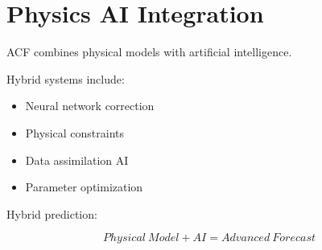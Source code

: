 \section{Physics AI Integration}


ACF combines physical models with artificial intelligence.



Hybrid systems include:


\begin{itemize}

\item Neural network correction

\item Physical constraints

\item Data assimilation AI

\item Parameter optimization

\end{itemize}



Hybrid prediction:


\[
Physical\ Model
+
AI
=
Advanced\ Forecast
\]
